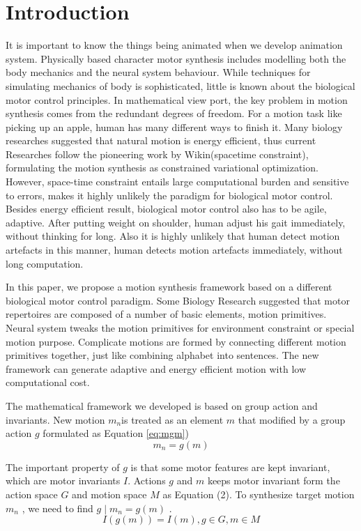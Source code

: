 \section{Introduction}
It is important to know the things being animated when we develop animation system. 
Physically based character motor synthesis includes modelling both the body mechanics and the neural system behaviour. 
While techniques for simulating mechanics of body is sophisticated, little is known about the biological motor control principles. 
In mathematical view port, the key problem in motion synthesis comes from the redundant degrees of freedom.  
For a motion task like picking up an apple, human has many different ways to finish it. 
Many biology researches suggested that natural motion is  energy efficient, thus current Researches follow the pioneering work by Wikin(spacetime constraint), formulating the motion synthesis as constrained variational optimization. 
However, space-time constraint entails large computational burden and sensitive to errors, makes it highly unlikely the paradigm for biological motor control. 
Besides energy efficient result, biological motor control also has to be agile, adaptive. 
After putting weight on shoulder, human adjust his gait immediately, without thinking for long.  
Also it is highly unlikely that human detect motion artefacts in this manner, human detects motion artefacts immediately, without long computation.

In this paper, we propose a motion synthesis framework based on a different biological motor control paradigm. 
Some Biology Research suggested that motor repertoires are composed of a number of basic elements, motion primitives. 
Neural system tweaks the motion primitives for environment constraint or special motion purpose. 
Complicate motions are formed by connecting different motion primitives together, just like combining alphabet into sentences. 
The new framework can generate adaptive and energy efficient motion with low computational cost. 



The mathematical framework we developed is based on group action and invariants. 
New motion $m_n$is treated as an element $m$  that modified by a group action $g$ formulated as Equation \eqref{eq:mgm})
\begin{equation}
	m_n=g(m)
\label{eq:mgm}
\end{equation}
	 										
The important property of $g$  is that some motor features are kept invariant, which are motor invariants  $I$. 
Actions $g$ and $m$  keeps motor invariant form the action space $G$ and motion space $M$ as Equation (2). 
To synthesize target motion $m_n$ , we need to find $g  \mid m_n=g(m)$ .
\begin{equation}
	I(g(m))=I(m),g \in G, m \in M
\end{equation}								

